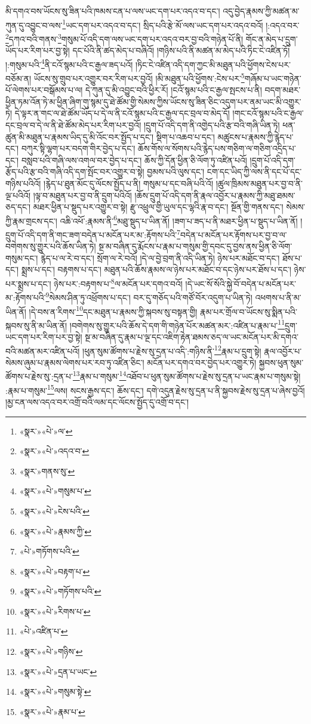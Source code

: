 མི་དགའ་བས་ཡོངས་སུ་ཟིན་པའི་ཁམས་ངན་པ་ལས་ཡང་དག་པར་འདའ་བ་དང་། འདུ་བྱེད་རྣམས་ཀྱི་མཚན་མ་ཀུན་དུ་འབྱུང་བ་ལས་\footnote{«སྣར་»«པེ་»ལ་}ཡང་དག་པར་འདའ་བ་དང་། སྲིད་པའི་རྩེ་མོ་ལས་ཡང་དག་པར་འདའ་བའོ། །:འདའ་བར་\footnote{«སྣར་»«པེ་»འདའ་བ་}དཀའ་བའི་གནས་\footnote{«སྣར་»གནས་སུ་}གསུམ་པོ་འདི་དག་ལས་ཡང་དག་པར་འདའ་བར་བྱ་བའི་གཉེན་པོ་ནི། གོང་ན་མེད་པ་དྲུག་ཡོད་པར་རིག་པར་བྱ་སྟེ། དང་པོའི་ནི་ཚད་མེད་པ་བཞིའོ། །གཉིས་པའི་ནི་མཚན་མ་མེད་པའི་ཏིང་ངེ་འཛིན་ཏོ། །:གསུམ་པའི་\footnote{«སྣར་»«པེ་»གསུམ་པ་}ནི་ངའོ་སྙམ་པའི་ང་རྒྱལ་ཟད་པའོ། །ཏིང་ངེ་འཛིན་འདི་དག་ཀྱང་མི་མཐུན་པའི་ཕྱོགས་ངེས་པར་བཅོམ་ན། ཡོངས་སུ་གྲུབ་པར་འགྱུར་བར་རིག་པར་བྱའོ། །མི་མཐུན་པའི་ཕྱོགས་:ངེས་པར་\footnote{«སྣར་»«པེ་»ངེས་པའི་}གཞོམ་པ་ཡང་གཉེན་པོ་ལེགས་པར་བསྒོམས་པ་ལ། དེ་ཀུན་དུ་མི་འབྱུང་བའི་ཕྱིར་རོ། །ངའོ་སྙམ་པའི་ང་རྒྱལ་སྤངས་པ་ནི། བདག་མཐར་ཕྱིན་ཏམ་འོན་ཏེ་མ་ཕྱིན་ཞིག་གུ་སྙམ་དུ་ཐེ་ཚོམ་གྱི་སེམས་ཀྱིས་ཡོངས་སུ་ཟིན་ཅིང་འདུག་པར་ནམ་ཡང་མི་འགྱུར་ཏེ། དེ་ལྟར་ན་གང་ལ་ཐེ་ཚོམ་ཡོད་པ་དེ་ལ་ནི་ངའོ་སྙམ་པའི་ང་རྒྱལ་དང་བྲལ་བ་མེད་དོ། །གང་ངའོ་སྙམ་པའི་ང་རྒྱལ་དང་བྲལ་བ་དེ་ལ་ནི་ཐེ་ཚོམ་མེད་པར་རིག་པར་བྱའོ། །དྲུག་པོ་འདི་དག་ནི་འགྱེད་པའི་རྩ་བའི་གཞི་ཡིན་ཏེ། ཕན་ཚུན་མི་མཐུན་པ་རྣམས་ཡིད་དུ་མི་འོང་བར་སྤྱོད་པ་དང་། སྡིག་པ་འཆབ་པ་དང་། མཚུངས་པ་རྣམས་ཀྱི་རྙེད་པ་དང་། བཀུར་སྟི་ལྷག་པར་བདག་གིར་བྱེད་པ་དང་། ཆོས་གོས་ལ་སོགས་པའི་རྙེད་པས་གཅིག་ལ་གཅིག་འདྲིད་པ་དང་། བསླབ་པའི་གཞི་ལས་འགལ་བར་བྱེད་པ་དང་། ཆོས་ཀྱི་དོན་ཕྱིན་ཅི་ལོག་ཏུ་འཛིན་པའོ། །དྲུག་པོ་འདི་དག་རྩོད་པའི་རྩ་བའི་གཞི་འདི་དག་སྤོང་བར་འགྱུར་བ་སྟེ། བྱམས་པའི་ལུས་དང་། ངག་དང་ཡིད་ཀྱི་ལས་ནི་དང་པོ་དང་གཉིས་པའིའོ། །རྙེད་པ་ཐུན་མོང་དུ་ལོངས་སྤྱོད་པ་ནི། གསུམ་པ་དང་བཞི་པའི་འོ། །ཚུལ་ཁྲིམས་མཐུན་པར་བྱ་བ་ནི་ལྔ་པའིའོ། །ལྟ་བ་མཐུན་པར་བྱ་བ་ནི་དྲུག་པའིའོ། །ཆོས་དྲུག་པོ་འདི་དག་ནི་རྣལ་འབྱོར་པ་རྣམས་ཀྱི་མཐུ་ཐམས་ཅད་དང་། མཐར་ཕྱིན་པ་སྡུད་པར་འགྱུར་བ་སྟེ། རྫུ་འཕྲུལ་གྱི་ཡུལ་དང་ལྷའི་རྣ་བ་དང་། སྔོན་གྱི་གནས་དང་། སེམས་ཀྱི་རྣམ་གྲངས་དང་། འཆི་འཕོ་:རྣམས་ནི་\footnote{«སྣར་»«པེ་»རྣམས་ཀྱི་}མཐུ་སྡུད་པ་ཡིན་ནོ། །ཟག་པ་ཟད་པ་ནི་མཐར་ཕྱིན་པ་སྡུད་པ་ཡིན་ནོ། །དྲུག་པོ་འདི་དག་ནི་གང་ཟག་བདེན་པ་མངོན་པར་མ་:རྟོགས་པའི་\footnote{«པེ་»གཏོགས་པའི་}བདེན་པ་མངོན་པར་རྟོགས་པར་བྱ་བ་ལ་བགེགས་སུ་གྱུར་པའི་ཆོས་ཡིན་ཏེ། སྔ་མ་བཞིན་དུ་རྨོངས་པ་རྣམ་པ་གསུམ་གྱི་དབང་དུ་བྱས་ནས་ཕྱིན་ཅི་ལོག་གསུམ་དང་། རྙེད་པ་ལ་རེ་བ་དང་། སྲོག་ལ་རེ་བའོ། །དེ་ལ་བྱེ་བྲག་ནི་འདི་ཡིན་ཏེ། ཉེས་པར་མཐོང་བ་དང་། ཐོས་པ་དང་། སྨྲས་པ་དང་། བརྟགས་པ་དང་། མཐུན་པའི་ཆོས་རྣམས་ལ་ཉེས་པར་མཐོང་བ་དང་ཉེས་པར་ཐོས་པ་དང་། ཉེས་པར་སྨྲས་པ་དང་། ཉེས་པར་:བརྟགས་པ་\footnote{«སྣར་»«པེ་»བརྟག་པ་}ལ་མངོན་པར་དགའ་བའོ། །དེ་ཡང་སོ་སོའི་སྐྱེ་བོ་བདེན་པ་མངོན་པར་མ་:རྟོགས་པའི་\footnote{«སྣར་»«པེ་»གཏོགས་པའི་}སེམས་ཤིན་ཏུ་འཕྲོགས་པ་དང་། བར་དུ་གཅོད་པའི་གཙོ་བོར་འདུག་པ་ཡིན་ཏེ། འཕགས་པ་ནི་མ་ཡིན་ནོ། །དེ་བས་ན་རིགས་\footnote{«སྣར་»«པེ་»རིགས་པ་}དང་མཐུན་པ་རྣམས་ཀྱི་སྐབས་སུ་བསྟན་གྱི། རྣམ་པར་གྲོལ་བ་ཡོངས་སུ་སྨིན་པའི་སྐབས་སུ་ནི་མ་ཡིན་ནོ། །བགེགས་སུ་གྱུར་པའི་ཆོས་དེ་དག་གི་གཉེན་པོར་མཚན་མར་:འཛིན་པ་རྣམ་པ་\footnote{«པེ་»འཛིན་པ་}དྲུག་ཡང་དག་པར་རིག་པར་བྱ་སྟེ། སྔ་མ་བཞིན་དུ་རྣམ་པ་ལྔ་དང་འཇིག་རྟེན་ཐམས་ཅད་ལ་ཡང་མངོན་པར་མི་དགའ་བའི་མཚན་མར་འཛིན་པའོ། །ཕུན་སུམ་ཚོགས་པ་རྗེས་སུ་དྲན་པ་འདི་:གཉིས་ནི་\footnote{«སྣར་»«པེ་»གཉིས་}རྣམ་པ་དྲུག་སྟེ། རྣལ་འབྱོར་པ་སེམས་ཞུམ་པ་རྣམས་ལེགས་པར་རབ་ཏུ་འཛིན་ཅིང་། མངོན་པར་དགའ་བར་བྱེད་པར་འགྱུར་ཏེ། སྐྱབས་ཕུན་སུམ་ཚོགས་པ་རྗེས་སུ་:དྲན་པ་\footnote{«སྣར་»«པེ་»དྲན་པ་ཡང་}རྣམ་པ་གསུམ་\footnote{«སྣར་»«པེ་»གསུམ་སྟེ་}འཐོབ་པ་ཕུན་སུམ་ཚོགས་པ་རྗེས་སུ་དྲན་པ་ཡང་རྣམ་པ་གསུམ་སྟེ། :རྣམ་པ་གསུམ་\footnote{«སྣར་»«པེ་»རྣམ་པ་}ལས། སངས་རྒྱས་དང་། ཆོས་དང་། དགེ་འདུན་རྗེས་སུ་དྲན་པ་ནི་སྐྱབས་རྗེས་སུ་དྲན་པ་ཞེས་བྱའོ། །མྱ་ངན་ལས་འདའ་བར་འགྲོ་བའི་ལམ་དང་ལོངས་སྤྱོད་དུ་འགྲོ་བ་དང་། 